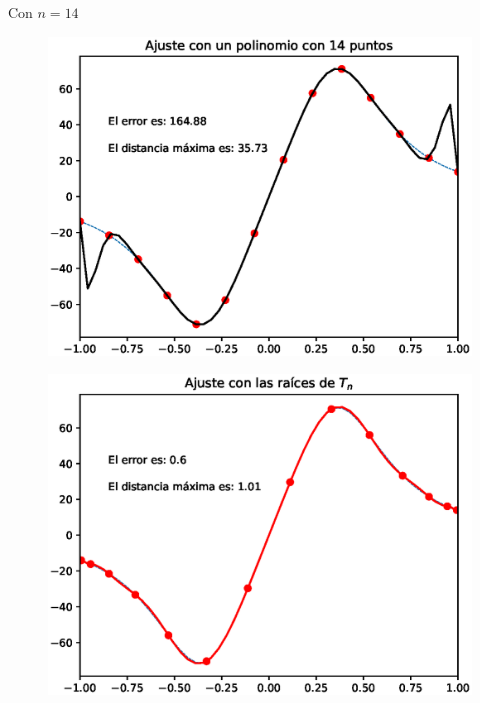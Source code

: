 \documentclass[12pt]{article}
\numberwithin{equation}{section}
\begin{document}
Con $n = 14$
\\
\begin{minipage}{0.45\linewidth}
    \begin{figure}[H]
    \centering
    \includegraphics[scale=0.44]{Imagenes/Interpolacion_Chebychev_14_Polinomio.eps}
    \end{figure}       
\end{minipage}
\hspace{0.1cm}
\begin{minipage}{0.45\linewidth}
\begin{figure}[H]
    \centering
    \includegraphics[scale=0.44]{Imagenes/Interpolacion_Chebychev_14_Raices.eps}
\end{figure}
\end{minipage}
\end{document}
